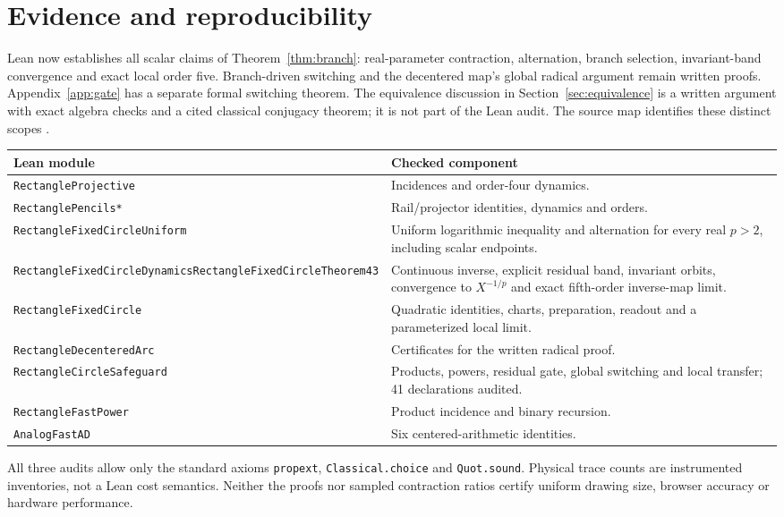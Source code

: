 \documentclass[11pt,a4paper]{article}
\begin{document}
\section{Evidence and reproducibility}\label{sec:scope}
Lean now establishes all scalar claims of Theorem~\ref{thm:branch}: real-parameter contraction, alternation, branch selection, invariant-band convergence and exact local order five. Branch-driven switching and the decentered map's global radical argument remain written proofs. Appendix~\ref{app:gate} has a separate formal switching theorem. The equivalence discussion in Section~\ref{sec:equivalence} is a written argument with exact algebra checks and a cited classical conjugacy theorem; it is not part of the Lean audit. The source map identifies these distinct scopes \cite{lean4,mathlib}.
\begin{center}\small
\begin{tabularx}{\linewidth}{@{}p{.34\linewidth}X@{}}\toprule
Lean module & Checked component\\\midrule
\texttt{RectangleProjective} & Incidences and order-four dynamics.\\
\texttt{RectanglePencils*} & Rail/projector identities, dynamics and orders.\\
\texttt{RectangleFixedCircle}\allowbreak\texttt{Uniform} & Uniform logarithmic inequality and alternation for every real $p>2$, including scalar endpoints.\\
\texttt{RectangleFixedCircle}\allowbreak\texttt{Dynamics}\newline\texttt{RectangleFixedCircle}\allowbreak\texttt{Theorem43} & Continuous inverse, explicit residual band, invariant orbits, convergence to $X^{-1/p}$ and exact fifth-order inverse-map limit.\\
\texttt{RectangleFixedCircle} & Quadratic identities, charts, preparation, readout and a parameterized local limit.\\
\texttt{RectangleDecenteredArc} & Certificates for the written radical proof.\\
\texttt{RectangleCircleSafeguard} & Products, powers, residual gate, global switching and local transfer; 41 declarations audited.\\
\texttt{RectangleFastPower} & Product incidence and binary recursion.\\
\texttt{AnalogFastAD} & Six centered-arithmetic identities.\\\bottomrule
\end{tabularx}\end{center}
All three audits allow only the standard axioms \texttt{propext}, \texttt{Classical.choice} and \texttt{Quot.sound}. Physical trace counts are instrumented inventories, not a Lean cost semantics. Neither the proofs nor sampled contraction ratios certify uniform drawing size, browser accuracy or hardware performance.
\end{document}

